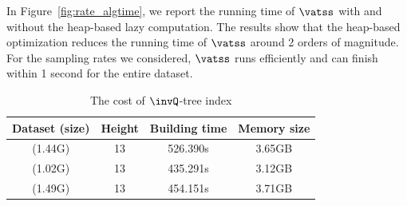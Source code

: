 In Figure~\ref{fig:rate_algtime}, we report the running time of $\vatss$  with and without the heap-based lazy computation.
The results show that the heap-based optimization reduces the running time of $\vatss$ around 2 orders of magnitude.
For the sampling rates we considered, $\vatss$ runs efficiently and can finish within 1 second for the entire dataset.







\begin{table}
	\centering
	\small
	\caption{The cost of $\invQ$-tree index}
	\vspace{-3mm}
	\begin{tabular}{|c|c|c|c|} \hline
		Dataset (size) & Height & Building time & Memory size \\ \hline
		\pt{} (1.44G)	& 13 & 526.390s & 3.65GB  \\ \hline
		\sz{} (1.02G)	& 13 & 435.291s  & 3.12GB \\ \hline
		\cd{} (1.49G)	& 13 & 454.151s & 3.71GB \\ \hline
	\end{tabular}	\label{tab:index cost}
	\trim %
\end{table}


